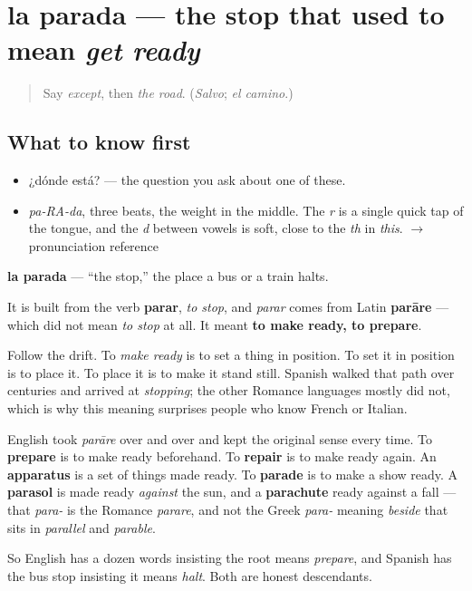 \section[la parada]{la parada — the stop that used to mean \emph{get ready}}

\label{lesson:ES-C330-parada}



\begin{quote}
Say \emph{except}, then \emph{the road}. (\emph{Salvo}; \emph{el camino}.)
\end{quote}

\subsection*{What to know first}
\begin{itemize}
\raggedright
  \item ¿dónde está? — the question you ask about one of these.
\end{itemize}

\begin{sounds}
\begin{itemize}
\raggedright
  \item \emph{pa-RA-da}, three beats, the weight in the middle. The \emph{r} is a single quick tap of the tongue, and the \emph{d} between vowels is soft, close to the \emph{th} in \emph{this}. $\to$ pronunciation reference
\end{itemize}
\end{sounds}

\begin{cousinweb}
\textbf{la parada} — \textquotedblleft{}the stop,\textquotedblright{} the place a bus or a train halts.

It is built from the verb \textbf{parar}, \emph{to stop}, and \emph{parar} comes from Latin \textbf{parāre} — which did not mean \emph{to stop} at all. It meant \textbf{to make ready, to prepare}.

Follow the drift. To \emph{make ready} is to set a thing in position. To set it in position is to place it. To place it is to make it stand still. Spanish walked that path over centuries and arrived at \emph{stopping}; the other Romance languages mostly did not, which is why this meaning surprises people who know French or Italian.

English took \emph{parāre} over and over and kept the original sense every time. To \textbf{prepare} is to make ready beforehand. To \textbf{repair} is to make ready again. An \textbf{apparatus} is a set of things made ready. To \textbf{parade} is to make a show ready. A \textbf{parasol} is made ready \emph{against} the sun, and a \textbf{parachute} ready against a fall — that \emph{para-} is the Romance \emph{parare}, and not the Greek \emph{para-} meaning \emph{beside} that sits in \emph{parallel} and \emph{parable}.

So English has a dozen words insisting the root means \emph{prepare}, and Spanish has the bus stop insisting it means \emph{halt}. Both are honest descendants.
\end{cousinweb}


